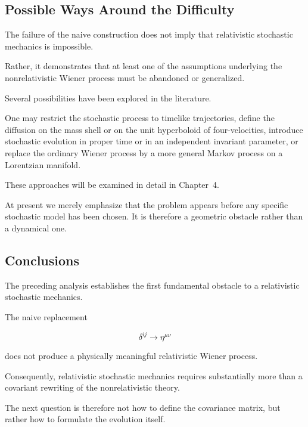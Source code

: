 \subsection{Possible Ways Around the Difficulty}

The failure of the naive construction does not imply that relativistic
stochastic mechanics is impossible.

Rather, it demonstrates that at least one of the assumptions underlying
the nonrelativistic Wiener process must be abandoned or generalized.

Several possibilities have been explored in the literature.

One may restrict the stochastic process to timelike trajectories, define
the diffusion on the mass shell or on the unit hyperboloid of
four-velocities, introduce stochastic evolution in proper time or in an
independent invariant parameter, or replace the ordinary Wiener process
by a more general Markov process on a Lorentzian manifold.

These approaches will be examined in detail in Chapter~4.

At present we merely emphasize that the problem appears before any
specific stochastic model has been chosen. It is therefore a geometric
obstacle rather than a dynamical one.

\subsection{Conclusions}

The preceding analysis establishes the first fundamental obstacle to a
relativistic stochastic mechanics.

The naive replacement

\[
\delta^{ij}
\longrightarrow
\eta^{\mu\nu}
\]

does not produce a physically meaningful relativistic Wiener process.

Consequently, relativistic stochastic mechanics requires substantially
more than a covariant rewriting of the nonrelativistic theory.

The next question is therefore not how to define the covariance matrix,
but rather how to formulate the evolution itself.

